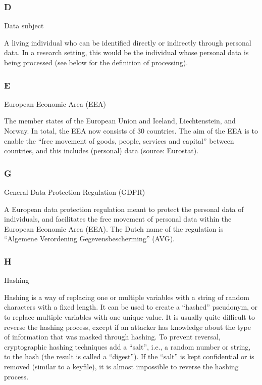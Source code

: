 \documentclass[
]{book}
\begin{document}
\hypertarget{d}{%
\subsubsection{D}\label{d}}

Data subject

A living individual who can be identified directly or indirectly through
personal data. In a research setting, this would be the individual whose
personal data is being processed (see below for the definition of processing).

\hypertarget{e}{%
\subsubsection{E}\label{e}}

European Economic Area (EEA)

The member states of the European Union and Iceland, Liechtenstein, and
Norway. In total, the EEA now consists of 30 countries. The aim of the EEA
is to enable the ``free movement of goods, people, services and capital''
between countries, and this includes (personal) data (source:
Eurostat).

\hypertarget{g}{%
\subsubsection{G}\label{g}}

General Data Protection Regulation (GDPR)

A European data protection regulation meant to protect the personal
data of individuals, and facilitates the free movement of personal data
within the European Economic Area (EEA). The Dutch name of the regulation is
``Algemene Verordening Gegevensbescherming'' (AVG).

\hypertarget{h}{%
\subsubsection{H}\label{h}}

Hashing

Hashing is a way of replacing one or multiple variables with a string of
random characters with a fixed length. It can be used to create a ``hashed''
pseudonym, or to replace multiple variables with one unique value. It is
usually quite difficult to reverse the hashing process, except if an attacker
has knowledge about the type of information that was masked through hashing.
To prevent reversal, cryptographic hashing techniques add a ``salt'', i.e., a
random number or string, to the hash (the result is called a ``digest''). If
the ``salt'' is kept confidential or is removed (similar to a keyfile), it is
almost impossible to reverse the hashing process.
\end{document}

